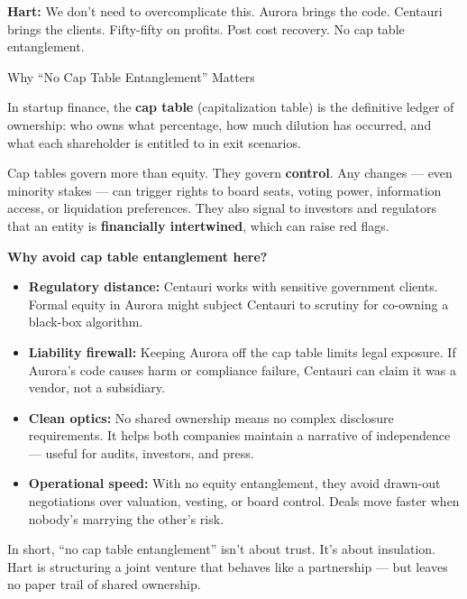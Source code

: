 \medskip

\textbf{Hart:}
We don’t need to overcomplicate this.
Aurora brings the code.
Centauri brings the clients.
Fifty-fifty on profits. Post cost recovery. No cap table entanglement.

\medskip

\begin{TechnicalSidebar}{Why “No Cap Table Entanglement” Matters}

  In startup finance, the \textbf{cap table} (capitalization table) is the definitive ledger of ownership:  
  who owns what percentage, how much dilution has occurred, and what each shareholder is entitled to in exit scenarios.
  
  \medskip
  
  Cap tables govern more than equity. They govern \textbf{control}.  
  Any changes — even minority stakes — can trigger rights to board seats, voting power, information access, or liquidation preferences.  
  They also signal to investors and regulators that an entity is \textbf{financially intertwined}, which can raise red flags.
  
  \medskip
  
  \textbf{Why avoid cap table entanglement here?}

  \medskip
  
  \begin{itemize}
    \item \textbf{Regulatory distance:} Centauri works with sensitive government clients. Formal equity in Aurora might subject Centauri to scrutiny for co-owning a black-box algorithm.
    
    \item \textbf{Liability firewall:} Keeping Aurora off the cap table limits legal exposure. If Aurora’s code causes harm or compliance failure, Centauri can claim it was a vendor, not a subsidiary.
    
    \item \textbf{Clean optics:} No shared ownership means no complex disclosure requirements. It helps both companies maintain a narrative of independence — useful for audits, investors, and press.
  
    \item \textbf{Operational speed:} With no equity entanglement, they avoid drawn-out negotiations over valuation, vesting, or board control. Deals move faster when nobody’s marrying the other’s risk.
  
  \end{itemize}

  \medskip
  
  In short, ``no cap table entanglement'' isn’t about trust. It’s about insulation.  
  Hart is structuring a joint venture that behaves like a partnership — but leaves no paper trail of shared ownership.
  
\end{TechnicalSidebar}


